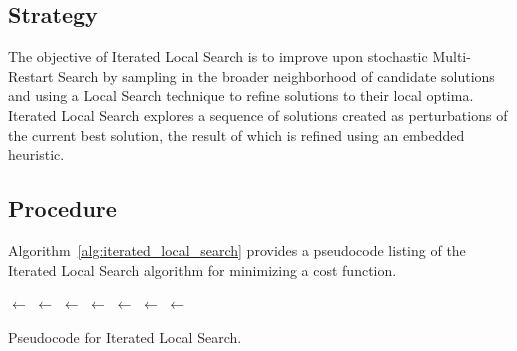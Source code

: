 \subsection{Strategy}
The objective of Iterated Local Search is to improve upon stochastic Multi-Restart Search by sampling in the broader neighborhood of candidate solutions and using a Local Search technique to refine solutions to their local optima.
Iterated Local Search explores a sequence of solutions created as perturbations of the current best solution, the result of which is refined using an embedded heuristic.

\subsection{Procedure}
Algorithm~\ref{alg:iterated_local_search} provides a pseudocode listing of the Iterated Local Search algorithm for minimizing a cost function.

\begin{algorithm}[htp]
	\SetLine
	\KwIn{}
	\KwOut{\Best}
	\Best $\leftarrow$ \ConstructInitialSolution{}\;
	\Best $\leftarrow$ \LocalSearch{}\;
	\SearchHistory $\leftarrow$ \Best\;
	\While{$\neg$ \StopCondition{}} {
		\Candidate $\leftarrow$ \Perturbation{\Best, \SearchHistory}\;
		\Candidate $\leftarrow$ \LocalSearch{\Candidate}\;
		\SearchHistory $\leftarrow$ \Candidate\;
		\If{\AcceptanceCriterion{\Best, \Candidate, \SearchHistory}} {
			\Best $\leftarrow$ \Candidate\;
		}
	}
	\Return{\Best}\;
	\caption{Pseudocode for Iterated Local Search.}
	\label{alg:iterated_local_search}
\end{algorithm}

